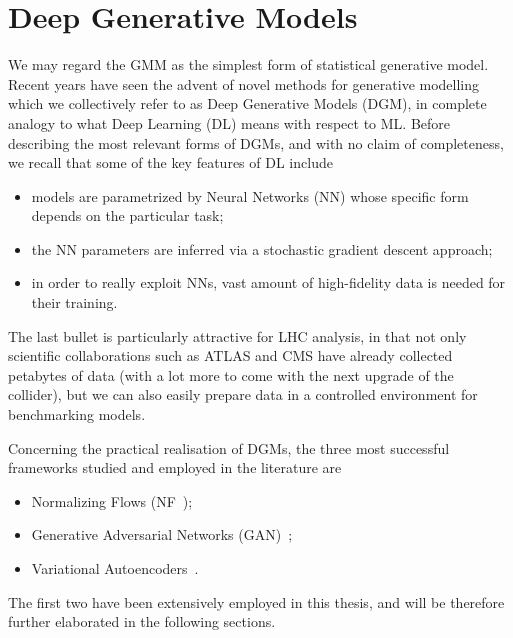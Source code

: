 \section{Deep Generative Models}\label{sec:DGM}
We may regard the GMM as the simplest form of statistical generative model. Recent years have seen the advent of novel methods for generative modelling which we collectively refer to as Deep Generative Models (DGM), in complete analogy to what Deep Learning (DL) means with respect to ML. 
Before describing the most relevant forms of DGMs, and with no claim of completeness, we recall that some of the key features of DL include
\begin{itemize}
\item
models are parametrized by Neural Networks (NN) whose specific form depends on the particular task;
\item
the NN parameters are inferred via a stochastic gradient descent approach;
\item
in order to really exploit NNs, vast amount of high-fidelity data is needed for their training.
\end{itemize}
The last bullet is particularly attractive for LHC analysis, in that not only scientific collaborations such as ATLAS and CMS have already collected petabytes of data (with a lot more to come with the next upgrade of the collider), but we can also easily prepare data in a controlled environment for benchmarking models.

Concerning the practical realisation of DGMs, the three most successful frameworks studied and employed in the literature are
\begin{itemize}
\item
Normalizing Flows (NF~\cite{inn,coupling2,glow, nflow1,papamakarios2019normalizing,nflow_review,mller2018neural, grathwohl2018ffjord,chen2019neural});
\item
Generative Adversarial Networks (GAN)~\cite{goodfellow,Creswell2018, wgan_gp, wgan_original, lim2017geometric, zhang2019selfattention};
\item
Variational Autoencoders~\cite{kingma2014autoencoding,Kingma2019}.
\end{itemize}
The first two have been extensively employed in this thesis, and will be therefore further elaborated in the following sections.

